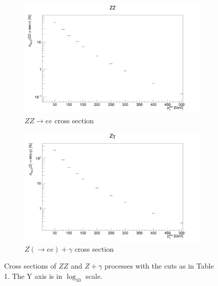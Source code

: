 \documentclass[11pt,a4paper,final]{report}
\begin{document}
\begin{figure}[H]
\centering
	\begin{subfigure}{0.49\textwidth}
		\includegraphics[width=\linewidth]{ZZ_xsec.png}
		\caption{$ZZ\rightarrow ee$ cross section}
	\end{subfigure}	
	\begin{subfigure}{0.49\textwidth}
		\includegraphics[width=\linewidth]{Zg_xsec.png}
		\caption{$Z(\rightarrow ee)+\gamma$ cross section}
	\end{subfigure}
	
	\caption{Cross sections of $ZZ$ and $Z+\gamma$ processes with the cuts as in Table 1. The Y axis is in $\log_{10}$ scale.}
	\label{xsecs}
\end{figure}
\end{document}
